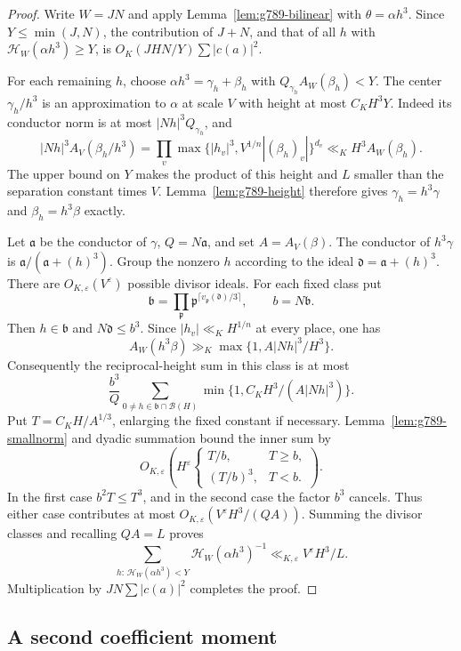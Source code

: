 \documentclass[11pt]{amsart}
\theoremstyle{definition}
\numberwithin{equation}{section}
\begin{document}
\begin{proof}
Write $W=JN$ and apply Lemma~\ref{lem:g789-bilinear} with
$\theta=\alpha h^3$. Since $Y\le\min(J,N)$, the contribution
of $J+N$, and that of all $h$ with $\mathcal H_W(\alpha h^3)\ge Y$,
is $O_K(JHN/Y)\sum|c(a)|^2$.

For each remaining $h$, choose
$\alpha h^3=\gamma_h+\beta_h$ with
$Q_{\gamma_h}A_W(\beta_h)<Y$. The center $\gamma_h/h^3$ is an
approximation to $\alpha$ at scale $V$ with height at most $C_KH^3Y$.
Indeed its conductor norm is at most $|Nh|^3Q_{\gamma_h}$, and
\[
 |Nh|^3 A_V(\beta_h/h^3)
 =\prod_v\max\{|h_v|^3,V^{1/n}|(\beta_h)_v|\}^{d_v}
 \ll_K H^3 A_W(\beta_h).
\]
The upper bound on $Y$ makes the product of this height and $L$
smaller than the separation constant times $V$.
Lemma~\ref{lem:g789-height} therefore gives
$\gamma_h=h^3\gamma$ and $\beta_h=h^3\beta$ exactly.

Let $\mathfrak a$ be the conductor of $\gamma$, $Q=N\mathfrak a$,
and set $A=A_V(\beta)$. The conductor of $h^3\gamma$ is
$\mathfrak a/(\mathfrak a+(h)^3)$. Group the nonzero $h$ according
to the ideal $\mathfrak d=\mathfrak a+(h)^3$.
There are $O_{K,\varepsilon}(V^\varepsilon)$ possible divisor ideals.
For each fixed class put
\[
 \mathfrak b=\prod_{\mathfrak p}
       \mathfrak p^{\lceil v_\mathfrak p(\mathfrak d)/3\rceil},
 \qquad b=N\mathfrak b.
\]
Then $h\in\mathfrak b$ and $N\mathfrak d\le b^3$.
Since $|h_v|\ll_KH^{1/n}$ at every place, one has
\[
 A_W(h^3\beta)\gg_K
       \max\{1,A|Nh|^3/H^3\}.
\]
Consequently the reciprocal-height sum in this class is at most
\[
 \frac{b^3}{Q}
 \sum_{0\ne h\in\mathfrak b\cap\mathcal B(H)}
       \min\{1,C_KH^3/(A|Nh|^3)\}.
\]
Put $T=C_KH/A^{1/3}$, enlarging the fixed constant if necessary.
Lemma~\ref{lem:g789-smallnorm} and dyadic summation bound the inner
sum by
\[
 O_{K,\varepsilon}\left(H^\varepsilon
 \begin{cases}T/b,&T\ge b,\\(T/b)^3,&T<b.\end{cases}\right).
\]
In the first case $b^2T\le T^3$, and in the second case the factor
$b^3$ cancels. Thus either case contributes at most
$O_{K,\varepsilon}(V^\varepsilon H^3/(QA))$.
Summing the divisor classes and recalling $QA=L$ proves
\[
 \sum_{h:\,\mathcal H_W(\alpha h^3)<Y}
       \mathcal H_W(\alpha h^3)^{-1}
 \ll_{K,\varepsilon}V^\varepsilon H^3/L.
\]
Multiplication by $JN\sum|c(a)|^2$ completes the proof.
\end{proof}

\subsection{A second coefficient moment}
\label{sec:k5-coeff2}
\end{document}
